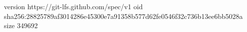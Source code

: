version https://git-lfs.github.com/spec/v1
oid sha256:28825789af3014286e45300e7a91358b577d62fe0546f32c736b13ee6bb5028a
size 349692
